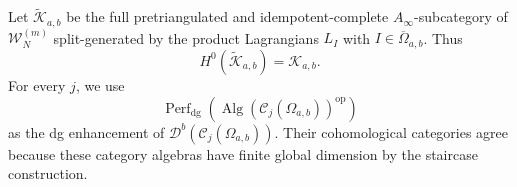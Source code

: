 \documentclass[12pt,a4paper,english,reqno]{amsart}
\theoremstyle{plain}
\theoremstyle{definition}
\newcommand{\op}{\mathrm{op}}
\newcommand{\C}{\mathcal C}
\newcommand{\Wcat}{\mathcal W}
\newcommand{\Db}[1]{{\mathscr D}^b(#1)}
\begin{document}
Let $\widetilde{\mathcal K}_{a,b}$ be the full pretriangulated and
idempotent-complete $A_\infty$-subcategory of $\Wcat_N^{(m)}$ split-generated
by the product Lagrangians $L_I$ with
$I\in\overline\Omega_{a,b}$.  Thus
\begin{equation}
 H^0(\widetilde{\mathcal K}_{a,b})=\mathcal K_{a,b}.
\label{eq:enhanced-K}
\end{equation}
For every $j$, we use
\begin{equation}
 \operatorname{Perf}_{\mathrm{dg}}
 \!\left(\operatorname{Alg}(\C_j(\Omega_{a,b}))^{\op}\right)
\label{eq:enhanced-Cj}
\end{equation}
as the dg enhancement of $\Db{\C_j(\Omega_{a,b})}$.  Their cohomological
categories agree because these category algebras have finite global
dimension by the staircase construction.
\end{document}
